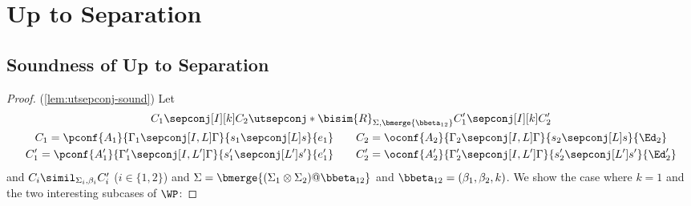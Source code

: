 \section{Up to Separation}

\subsection{Soundness of Up to Separation}
\label{appx:uptosep-sound}

\begin{proof}(\cref{lem:utsepconj-sound})
  Let
  \begin{gather*}
    C_1 \sepconj[I][k] C_2 \utsepconj*{\bisim{R}}_{\Sigma,\bmerge{\bbeta_{12}}} C_1' \sepconj[I][k] C_2'\\
    C_1 = \pconf{A_1}{\Gamma_1\sepconj[I,L]\Gamma}{s_1\sepconj[L] s}{e_1} \qquad
    C_2 = \oconf{A_2}{\Gamma_2\sepconj[I,L]\Gamma}{s_2\sepconj[L] s}{\Ed_2} \\
    C_1' = \pconf{A_1'}{\Gamma_1'\sepconj[I,L']\Gamma}{s_1'\sepconj[L'] s'}{e_1'} \qquad
    C_2' = \oconf{A_2'}{\Gamma_2'\sepconj[I,L']\Gamma}{s_2'\sepconj[L'] s'}{\Ed_2'}
  \end{gather*}
  and
  $C_i \simil_{\Sigma_i,\beta_i} C_i'$ ($i\in\{1,2\}$)
  and
  $\Sigma=\bmerge{(\Sigma_1\otimes\Sigma_2)@\bbeta_{12}}$
  and
  $\bbeta_{12}= (\beta_1,\beta_2,k)$.
  We show the case where $k=1$ and the two interesting subcases of $\WP$:
  

\end{proof}
